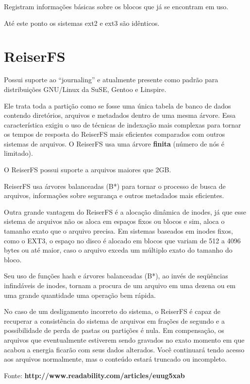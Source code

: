 Registram informações básicas sobre os blocos que já se encontram em uso.

Até este ponto os sistemas ext2 e ext3 são idênticos.

\section{ReiserFS}

Possui suporte ao ``journaling'' e atualmente presente como padrão para distribuições GNU/Linux da SuSE, Gentoo e Linspire.

Ele trata toda a partição como se fosse uma única tabela de banco de dados contendo diretórios, arquivos e metadados dentro de uma mesma árvore. Essa característica exigiu o uso de técnicas de indexação mais complexas para tornar os tempos de resposta do ReiserFS mais eficientes comparados com outros sistemas de arquivos. O ReiserFS usa uma árvore \textbf{finita} (número de nós é limitado).

O ReiserFS possui suporte a arquivos maiores que 2GB.

ReiserFS usa árvores balanceadas (B*) para tornar o processo de busca de arquivos, informações sobre segurança e outros metadados mais eficientes.

Outra grande vantagem do ReiserFS é a alocação dinâmica de inodes, já que esse sistema de arquivos não os aloca em espaços fixos ou blocos e sim, aloca o tamanho exato que o arquivo precisa. Em sistemas baseados em inodes fixos, como o EXT3, o espaço no disco é alocado em blocos que variam de 512 a 4096 bytes ou até maior, caso o arquivo exceda um múltiplo exato do tamanho do bloco.

Seu uso de funções hash e árvores balanceadas (B*), ao invés de seqüências infindáveis de inodes, tornam a procura de um arquivo em uma dezena ou em uma grande quantidade uma operação bem rápida.

No caso de um desligamento incorreto do sistema, o ReiserFS é capaz de recuperar a consistência do sistema de arquivos em frações de segundo e a possibilidade de perda de pastas ou partições é nula. Em compensação, os arquivos que eventualmente estiverem sendo gravados no exato momento em que acabou a energia ficarão com seus dados alterados. Você continuará tendo acesso aos arquivos normalmente, mas o conteúdo estará truncado ou incompleto.

Fonte: \textbf{http://www.readability.com/articles/euug5xab}

